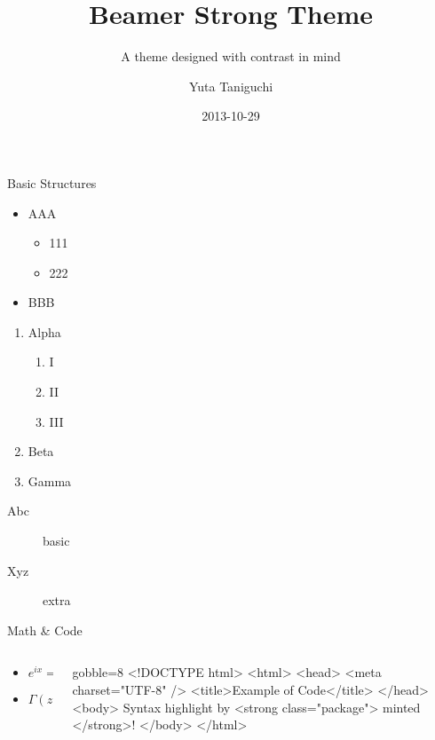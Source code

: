 \documentclass[14pt,t]{beamer}
\title{Beamer Strong Theme}
\subtitle{A theme designed with contrast in mind}
\author{Yuta Taniguchi}
\institute{@yuttieyuttie}
\date{2013-10-29}
\begin{document}
{
  \frame{\titlepage}
}
\setcounter{framenumber}{0}


\begin{frame}{Basic Structures}
  \begin{itemize}
  \item AAA
    \begin{itemize}
    \item 111
    \item 222
    \end{itemize}
  \item BBB
  \end{itemize}
  \begin{enumerate}
  \item Alpha
    \begin{enumerate}
    \item I
    \item II
    \item III
    \end{enumerate}
  \item Beta
  \item Gamma
  \end{enumerate}
  \begin{description}
  \item[Abc] basic
  \item[Xyz] extra
  \end{description}
\end{frame}


\begin{frame}[fragile]{Math \& Code}
  \begin{columns}
    \begin{column}{0.5\textwidth}
      \begin{itemize}
      \item $e^{ix} = \cos x + i \sin x$
      \item $\Gamma(z) = \int_0^\infty t^{z-1} e^{-t} dt$
      \end{itemize}
    \end{column}
    \begin{column}{0.5\textwidth}
      \begin{html*}{gobble=8}
        <!DOCTYPE html>
        <html>
          <head>
            <meta charset="UTF-8" />
            <title>Example of Code</title>
          </head>
          <body>
            Syntax highlight by
            <strong class="package">
              minted
            </strong>!
          </body>
        </html>
      \end{html*}
    \end{column}
  \end{columns}
\end{frame}
\end{document}
